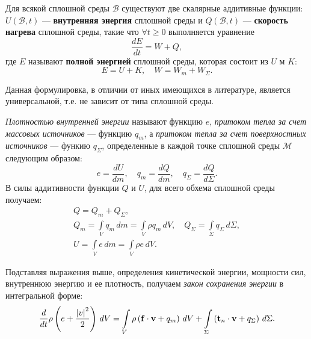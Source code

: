\begin{axiom*}
	Для всякой сплошной среды $\mathcal{B}$ существуют две скалярные аддитивные функции: $U(\mathcal{B}, t)$ --- \textbf{внутренняя энергия} сплошной среды и $Q(\mathcal{B}, t)$ --- \textbf{скорость нагрева} сплошной среды, такие что $\forall t \geqslant 0$ выполняется уравнение
	\begin{equation*}
		\frac{dE}{dt} = W + Q,
	\end{equation*}
	где $E$ называют \textbf{полной энергией} сплошной среды, которая состоит из $U$ м $K$:
	\begin{equation*}
		E = U + K, \quad W = W_{m} + W_{\Sigma}.
	\end{equation*}
\end{axiom*}
\begin{remark*}
	Данная формулировка, в отличии от иных имеющихся в литературе, является универсальной, т.е. не зависит от типа сплошной среды. 
\end{remark*}
\begin{definition*}
	\textit{Плотностью внутренней энергии} называют функцию $e$, \textit{притоком тепла за счет массовых источников} --- функцию $q_m$, а \textit{притоком тепла за счет поверхностных источников} --- функию $q_{\Sigma}$, определенные в каждой точке сплошной среды $\mathcal{M}$ следующим образом:
	\begin{equation*}
		e = \frac{dU}{dm}, \quad q_m = \frac{dQ}{dm}, \quad q_{\Sigma} = \frac{dQ}{d\Sigma}.
	\end{equation*}
	В силы аддитивности функции $Q$ и $U$, для всего обхема сплошной среды получаем:
	\begin{gather*}
		Q = Q_m + Q_{\Sigma}, \\
		Q_m = \int\limits_{V} q_m \, dm = \int\limits_{V} \rho q_m \, dV, \quad Q_{\Sigma} = \int\limits_{\Sigma} q_{\Sigma} \, d\Sigma, \\
		U = \int\limits_{V} e \, dm = \int\limits_{V} \rho e \, dV.
	\end{gather*}
\end{definition*}

Подставляя выражения выше, определения кинетической энергии, мощности сил, внутреннюю энергию и ее плотность, получаем \textit{закон сохранения энергии} в интегральной форме:
\begin{equation*}
	\frac{d}{dt} \rho \left(e + \frac{\abs{v}^2}{2}\right) \, dV = \int\limits_{V} \rho \left(\mathbf{f} \cdot \mathbf{v} + q_m\right) \, dV + \int\limits_{\Sigma} \left(\mathbf{t}_n \cdot \mathbf{v} + q_{\Sigma}\right) \, d\Sigma.
\end{equation*}

